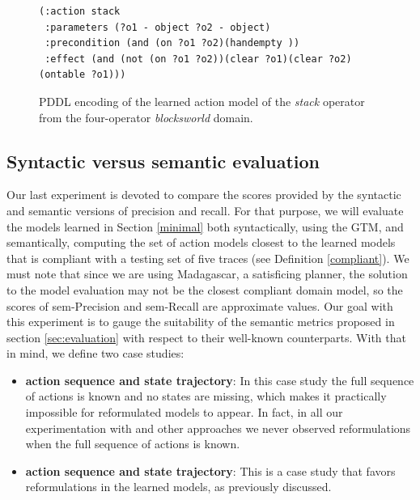 \begin{figure}[hbt!]
	\begin{footnotesize}
		\begin{verbatim}
(:action stack
 :parameters (?o1 - object ?o2 - object)
 :precondition (and (on ?o1 ?o2)(handempty ))
 :effect (and (not (on ?o1 ?o2))(clear ?o1)(clear ?o2)(ontable ?o1)))
		\end{verbatim}
	\end{footnotesize}
	\caption{PDDL encoding of the learned action model of the {\em stack} operator from the four-operator {\em blocksworld} domain.}
	\label{fig:macroaction}
\end{figure}



\subsection{Syntactic versus semantic evaluation}

Our last experiment is devoted to compare the scores provided by the syntactic and semantic versions of precision and recall. For that purpose, we will evaluate the models learned in Section \ref{minimal} both syntactically, using the GTM, and semantically, computing the set of action models closest to the learned models that is compliant with a testing set of five traces (see Definition \ref{compliant}). We must note that since we are using {\sc Madagascar}, a satisficing planner, the solution to the model evaluation may not be the closest compliant domain model, so the scores of sem-Precision and sem-Recall are approximate values. Our goal with this experiment is to gauge the suitability of the semantic metrics proposed in section \ref{sec:evaluation} with respect to their well-known counterparts. With that in mind, we define two case studies:

\begin{itemize}
	\item \textbf{\FO action sequence and \PO state trajectory}: In this case study the full sequence of actions is known and no states are missing, which makes it practically impossible for reformulated models to appear. In fact, in all our experimentation with \FAMA and other approaches we never observed reformulations when the full sequence of actions is known.
	\item  \textbf{\NO action sequence and \NO state trajectory}: This is a case study that favors reformulations in the learned models, as previously discussed.
\end{itemize}

